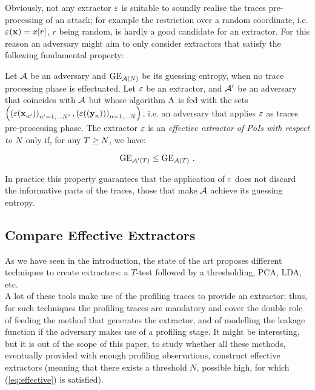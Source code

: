 Obviously, not any extractor $\extract$ is suitable to soundly realise the traces pre-processing of an attack; for example the restriction over a random coordinate, i.e. $\extractor{\sss[]{}} = x[r]$, $r$ being random, is hardly a good candidate for an extractor. For this reason an adversary might aim to only consider extractors that satisfy the following fundamental property:

\begin{property}
Let $\adversary$ be an adversary and $\guessingEntropy_{\adversary(\numTraces[])}$ be its guessing entropy, when no trace processing phase is effectuated. Let $\extract$ be an extractor, and $\adversary'$ be an adversary that coincides with $\adversary$ but whose algorithm $\attackAlgorithm$ is fed with the sets $ \left( \left(\extract(\sss[]{n'})\right)_{n'=1,\dots \numTraces[]'}, \left(\extract((\sssTest[]{n}))\right)_{n=1,\dots \numTraces[]} \right)$, i.e. an adversary that applies $\extract$ as traces pre-processing phase. The extractor $\extract$ is an {\em effective  extractor of PoIs with respect to $\numTraces[]$} only if, for any $T \geq\numTraces[] $, we have:

\begin{equation}\label{eq:effective}
\guessingEntropy_{\adversary'(T)} \leq \guessingEntropy_{\adversary(T)}\mbox{ .}
\end{equation}

\end{property}
In practice this property guarantees that the application of $\extract$ does not discard the informative parts of the traces, those that make $\adversary$ achieve its guessing entropy.

\subsection{Compare Effective Extractors}\label{sec:fourCriteria}


As we have seen in the introduction, the state of the art proposes different techniques to create extractors:  a $T$-test followed by a thresholding, PCA, LDA, etc.\\
A lot of these tools make use of the profiling traces to provide an extractor; thus, for such techniques the profiling traces are mandatory and cover the double role of feeding the method that generates the extractor, and of modelling the leakage function if the adversary makes use of a profiling stage. It might be interesting, but it is out of the scope of this paper, to study whether all these methods, eventually provided with enough profiling observations, construct effective extractors (meaning that there exists a threshold $N$, possible high, for which (\ref{eq:effective}) is satisfied).\\

